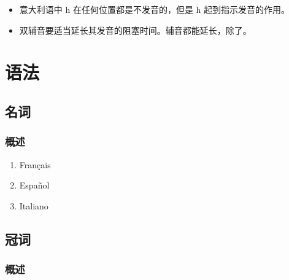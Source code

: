 \documentclass[UTF8,a4paper,titlepage,10pt]{report}
\begin{document}
\begin{enumerate}
\begin{itemize}
\item 意大利语中 h 在任何位置都是不发音的，但是 h 起到指示发音的作用。
\item 双辅音要适当延长其发音的阻塞时间。辅音都能延长，除了\textipa{[z]}。
\end{itemize}
\end{enumerate}

\part{语法}
\label{sec:org6c0172b}

\chapter{名词}
\label{sec:org2bdad5b}

\section{概述}
\label{sec:orgbf0c176}

\begin{enumerate}
\item Français
\label{sec:org2f9c8ee}

\item Español
\label{sec:org2a437c3}

\item Italiano
\label{sec:org926f32f}
\end{enumerate}

\chapter{冠词}
\label{sec:org0b3c34b}

\section{概述}
\label{sec:org36a36f1}
\end{document}

